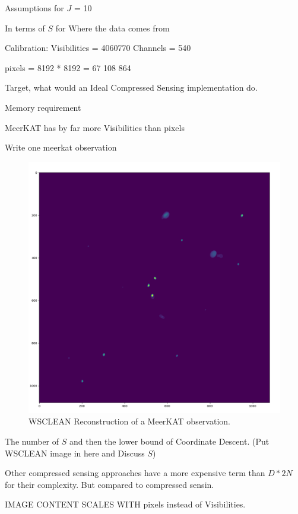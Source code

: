 Assumptions for $J$ = 10


In terms of $S$ for 
Where the data comes from

Calibration: 
Visibilities = 4060770
Channels = 540

pixels = 8192 * 8192 = 67 108 864

Target, what would an Ideal Compressed Sensing implementation do.

Memory requirement

MeerKAT has by far more Visibilities than pixels

Write one meerkat observation

\begin{figure}[h]
	\centering
	\includegraphics[width=0.5\linewidth]{./chapters/05.algorithms/sim00/full_cache_debug.png}
	\caption{WSCLEAN Reconstruction of a MeerKAT observation.}
	\label{results:wsclean}
\end{figure}
The number of $S$ and then the lower bound of Coordinate Descent. (Put WSCLEAN image in here and Discuss $S$)



Other compressed sensing approaches have a more expensive term than $D*2N$ for their complexity. But compared to compressed sensin.


IMAGE CONTENT SCALES WITH pixels instead of Visibilities.

